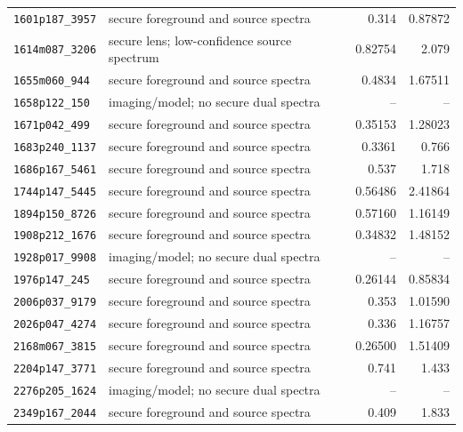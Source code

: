\begin{table}
{\begin{tabular}{p{}p{}p{}rr}
\texttt{1601p187\_3957} & secure foreground and source spectra & \citep{Lin2026,Tran2022} & 0.314 & 0.87872 \\
\texttt{1614m087\_3206} & secure lens; low-confidence source spectrum & \citep{Lin2026} & 0.82754 & 2.079 \\
\texttt{1655m060\_944} & secure foreground and source spectra & \citep{Zaborowski2023,Huang2026} & 0.4834 & 1.67511 \\
\texttt{1658p122\_150} & imaging/model; no secure dual spectra & \citep{Huang2026} & -- & -- \\
\texttt{1671p042\_499} & secure foreground and source spectra & \citep{Lin2026} & 0.35153 & 1.28023 \\
\texttt{1683p240\_1137} & secure foreground and source spectra & \citep{Kubo2009} & 0.3361 & 0.766 \\
\texttt{1686p167\_5461} & secure foreground and source spectra & \citep{Stark2013,Lin2026} & 0.537 & 1.718 \\
\texttt{1744p147\_5445} & secure foreground and source spectra & \citep{Lin2026} & 0.56486 & 2.41864 \\
\texttt{1894p150\_8726} & secure foreground and source spectra & \citep{Huang2026,Tran2022} & 0.57160 & 1.16149 \\
\texttt{1908p212\_1676} & secure foreground and source spectra & \citep{Lin2026} & 0.34832 & 1.48152 \\
\texttt{1928p017\_9908} & imaging/model; no secure dual spectra & \citep{Huang2026} & -- & -- \\
\texttt{1976p147\_245} & secure foreground and source spectra & \citep{Lin2026} & 0.26144 & 0.85834 \\
\texttt{2006p037\_9179} & secure foreground and source spectra & \citep{Lin2026,Tran2022} & 0.353 & 1.01590 \\
\texttt{2026p047\_4274} & secure foreground and source spectra & \citep{Huang2026,Lin2026,Tran2022} & 0.336 & 1.16757 \\
\texttt{2168m067\_3815} & secure foreground and source spectra & \citep{Zaborowski2023,Tran2022} & 0.26500 & 1.51409 \\
\texttt{2204p147\_3771} & secure foreground and source spectra & \citep{Stark2013,Pettini2010} & 0.741 & 1.433 \\
\texttt{2276p205\_1624} & imaging/model; no secure dual spectra & \citep{Huang2026} & -- & -- \\
\texttt{2349p167\_2044} & secure foreground and source spectra & \citep{Huang2026,Tran2022,Barone2026} & 0.409 & 1.833 \\

\end{tabular}}
\end{table}
